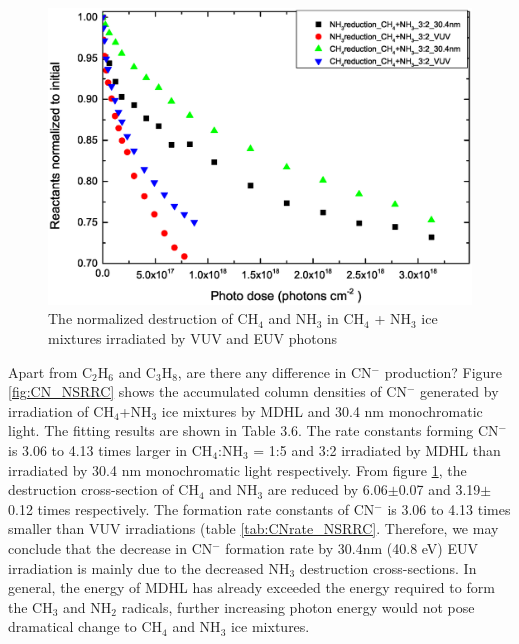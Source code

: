\begin{figure}
\centering
\includegraphics[width=\textwidth]{figures/chapter3/Reactants_normalized_to_initial.eps}
\caption{The normalized destruction of CH$_4$ and NH$_3$ in CH$_4$ + NH$_3$ ice mixtures irradiated by VUV and EUV photons}
\label{fig:normalized_reactants}
\end{figure}

Apart from C$_2$H$_6$ and C$_3$H$_8$, are there any difference in CN$^-$ production? Figure \ref{fig:CN_NSRRC} shows the accumulated column densities of CN$^-$ generated by irradiation of CH$_4$+NH$_3$ ice mixtures by MDHL and 30.4 nm monochromatic light. The fitting results are shown in Table 3.6. The rate constants forming CN$^-$ is 3.06 to 4.13 times larger in CH$_4$:NH$_3$ = 1:5 and 3:2 irradiated by MDHL than irradiated by 30.4 nm monochromatic light respectively. From figure \ref{fig:normalized_reactants}, the destruction cross-section of CH$_4$ and NH$_3$ are reduced by 6.06$\pm$0.07 and 3.19$\pm$0.12 times respectively. The formation rate constants of CN$^-$ is 3.06 to 4.13 times smaller than VUV irradiations (table \ref{tab:CNrate_NSRRC}. Therefore, we may conclude that the decrease in CN$^-$ formation rate by 30.4nm (40.8 eV) EUV irradiation is mainly due to the decreased NH$_3$ destruction cross-sections. In general, the energy of MDHL has already exceeded the energy required to form the CH$_3$ and NH$_2$ radicals, further increasing photon energy would not pose dramatical change to CH$_4$ and NH$_3$ ice mixtures.\\

